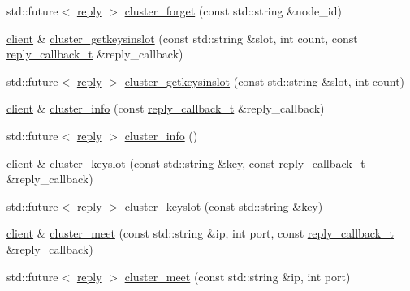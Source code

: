 \begin{DoxyCompactItemize}
\item 
std\+::future$<$ \hyperlink{classcpp__redis_1_1reply}{reply} $>$ \hyperlink{classcpp__redis_1_1client_a58457400352dee764066bd9f737f667a}{cluster\+\_\+forget} (const std\+::string \&node\+\_\+id)
\item 
\hyperlink{classcpp__redis_1_1client}{client} \& \hyperlink{classcpp__redis_1_1client_a716e31987800e3ca5483f72972fecfb0}{cluster\+\_\+getkeysinslot} (const std\+::string \&slot, int count, const \hyperlink{classcpp__redis_1_1client_a061a1140d36d2eaeda82b09a0bb3f9f2}{reply\+\_\+callback\+\_\+t} \&reply\+\_\+callback)
\item 
std\+::future$<$ \hyperlink{classcpp__redis_1_1reply}{reply} $>$ \hyperlink{classcpp__redis_1_1client_ad644ef5c24f3eb51de30a827753cc077}{cluster\+\_\+getkeysinslot} (const std\+::string \&slot, int count)
\item 
\hyperlink{classcpp__redis_1_1client}{client} \& \hyperlink{classcpp__redis_1_1client_a831d52a9dc9115e817bae15db0fb18a6}{cluster\+\_\+info} (const \hyperlink{classcpp__redis_1_1client_a061a1140d36d2eaeda82b09a0bb3f9f2}{reply\+\_\+callback\+\_\+t} \&reply\+\_\+callback)
\item 
std\+::future$<$ \hyperlink{classcpp__redis_1_1reply}{reply} $>$ \hyperlink{classcpp__redis_1_1client_a993170e08c425a810fa757bd4c202d10}{cluster\+\_\+info} ()
\item 
\hyperlink{classcpp__redis_1_1client}{client} \& \hyperlink{classcpp__redis_1_1client_ae0314fc2697674f4be4fca1cc5cbd4a1}{cluster\+\_\+keyslot} (const std\+::string \&key, const \hyperlink{classcpp__redis_1_1client_a061a1140d36d2eaeda82b09a0bb3f9f2}{reply\+\_\+callback\+\_\+t} \&reply\+\_\+callback)
\item 
std\+::future$<$ \hyperlink{classcpp__redis_1_1reply}{reply} $>$ \hyperlink{classcpp__redis_1_1client_a5681ac2dfdacc19cde1a828d8b801df1}{cluster\+\_\+keyslot} (const std\+::string \&key)
\item 
\hyperlink{classcpp__redis_1_1client}{client} \& \hyperlink{classcpp__redis_1_1client_aefc94be1dc7eb11673ba92bc8cbffdcf}{cluster\+\_\+meet} (const std\+::string \&ip, int port, const \hyperlink{classcpp__redis_1_1client_a061a1140d36d2eaeda82b09a0bb3f9f2}{reply\+\_\+callback\+\_\+t} \&reply\+\_\+callback)
\item 
std\+::future$<$ \hyperlink{classcpp__redis_1_1reply}{reply} $>$ \hyperlink{classcpp__redis_1_1client_af142b166d5f88f76f5fd46e6e33c0523}{cluster\+\_\+meet} (const std\+::string \&ip, int port)
\item 

\end{DoxyCompactItemize}
